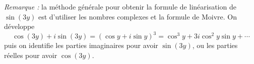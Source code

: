 {\begin{enumerate}
{\bigskip

\emph{Remarque :} la méthode générale pour obtenir la formule de linéarisation de $\sin(3y)$ est 
d'utiliser les nombres complexes
et la formule de Moivre. On développe 
$$\cos(3y) + i \sin(3y) = (\cos y + i \sin y)^3 = \cos^3 y + 3i\cos^2y \sin y + \cdots$$ 
puis on identifie les parties imaginaires pour avoir $\sin(3y)$, 
ou les parties réelles pour avoir $\cos(3y)$.}
\end{enumerate}
}
